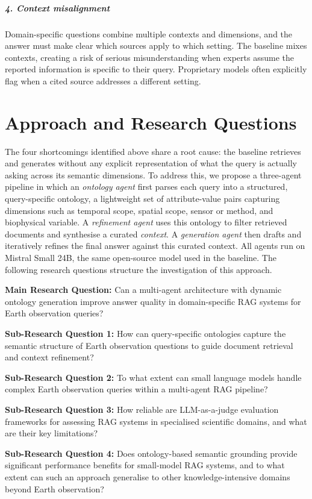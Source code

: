 \subparagraph{4. Context misalignment}

Domain-specific questions combine multiple contexts and dimensions, and the answer must make clear which sources apply to which setting. The baseline mixes contexts, creating a risk of serious misunderstanding when experts assume the reported information is specific to their query. Proprietary models often explicitly flag when a cited source addresses a different setting.

\section{Approach and Research Questions}
\label{sec:research-questions}

The four shortcomings identified above share a root cause: the baseline retrieves and generates without any explicit representation of what the query is actually asking across its semantic dimensions. To address this, we propose a three-agent pipeline in which an \emph{ontology agent} first parses each query into a structured, query-specific ontology, a lightweight set of attribute-value pairs capturing dimensions such as temporal scope, spatial scope, sensor or method, and biophysical variable. A \emph{refinement agent} uses this ontology to filter retrieved documents and synthesise a curated \emph{context}. A \emph{generation agent} then drafts and iteratively refines the final answer against this curated context. All agents run on Mistral Small 24B, the same open-source model used in the baseline. The following research questions structure the investigation of this approach.

\textbf{Main Research Question:} Can a multi-agent architecture with dynamic ontology generation improve answer quality in domain-specific RAG systems for Earth observation queries?

\textbf{Sub-Research Question 1:} How can query-specific ontologies capture the semantic structure of Earth observation questions to guide document retrieval and context refinement?

\textbf{Sub-Research Question 2:} To what extent can small language models handle complex Earth observation queries within a multi-agent RAG pipeline?

\textbf{Sub-Research Question 3:} How reliable are LLM-as-a-judge evaluation frameworks for assessing RAG systems in specialised scientific domains, and what are their key limitations?

\textbf{Sub-Research Question 4:} Does ontology-based semantic grounding provide significant performance benefits for small-model RAG systems, and to what extent can such an approach generalise to other knowledge-intensive domains beyond Earth observation?

